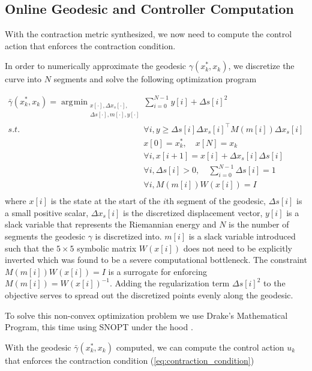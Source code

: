 \documentclass[journal]{IEEEtran}
\DeclareMathOperator*{\argmin}{\arg\!\min}
\begin{document}
\subsection{Online Geodesic and Controller Computation}
With the contraction metric synthesized, we now need to compute the control action that enforces the contraction condition.

In order to numerically approximate the geodesic $\gamma(x^*_k, x_k)$, we discretize the curve into $N$ segments and solve the following optimization program

\begin{equation}
	\label{eq:geodesic_opt}
	\begin{aligned}
		\bar{\gamma}(x^*_k, x_k) =
		\argmin_{ \substack{ x[\cdot], \Delta x_{s}[\cdot],\\ \Delta s[\cdot], m[\cdot], y[\cdot]}}
		 & \sum_{i=0}^{N-1} y[i] + \Delta s[i]^2 \\
		s.t. \quad & \forall i, y \geq \Delta s[i] \Delta x_s[i]^\top M(m[i]) \Delta x_s[i]\\
		& x[0] = x^*_k, \quad x[N] = x_k \\
		& \forall i, x[i+1] = x[i] + \Delta x_{s}[i]\Delta s[i] \\
		& \forall i, \Delta s[i] > 0, \quad \sum_{i=0}^{N-1} \Delta s[i] = 1\\
		& \forall i, M(m[i]) W(x[i]) = I  \\
	\end{aligned}
\end{equation}
where $x[i]$ is the state at the start of the $i$th segment of the geodesic, $\Delta s[i]$ is a small positive scalar, $\Delta x_s[i]$ is the discretized displacement vector, $y[i]$ is a slack variable that represents the Riemannian energy and $N$ is the number of segments the geodesic $\gamma$ is discretized into. $m[i]$ is a slack variable introduced such that the $5\times5$ symbolic matrix $W(x[i])$ does not need to be explicitly inverted which was found to be a severe computational bottleneck. The constraint $M(m[i]) W(x[i]) = I$ is a surrogate for enforcing $M(m[i])=W(x[i])^{-1}$. Adding the regularization term $\Delta s[i]^2$ to the objective serves to spread out the discretized points evenly along the geodesic.

To solve this non-convex optimization problem we use Drake's Mathematical Program, this time using SNOPT under the hood \autocite{DrakeModelBasedDesign}.

With the geodesic $\bar{\gamma}(x^*_k, x_k)$ computed, we can compute the control action $u_k$ that enforces the contraction condition (\ref{eq:contraction_condition})
\end{document}
